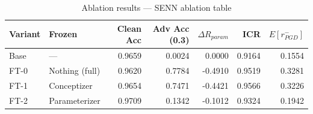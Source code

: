 \begin{table}
\caption{Ablation results — SENN ablation table}
\label{tab:SENN_ablation_table}
\begin{tabular}{llrrrrr}
\toprule
Variant & Frozen & Clean Acc & Adv Acc (0.3) & $\Delta R_{param}$ & ICR & $E[r_{PGD}^-]$ \\
\midrule
Base & — & 0.9659 & 0.0024 & 0.0000 & 0.9164 & 0.1554 \\
FT-0 & Nothing (full) & 0.9620 & 0.7784 & -0.4910 & 0.9519 & 0.3281 \\
FT-1 & Conceptizer & 0.9654 & 0.7471 & -0.4421 & 0.9566 & 0.3226 \\
FT-2 & Parameterizer & 0.9709 & 0.1342 & -0.1012 & 0.9324 & 0.1942 \\
\bottomrule
\end{tabular}
\end{table}
